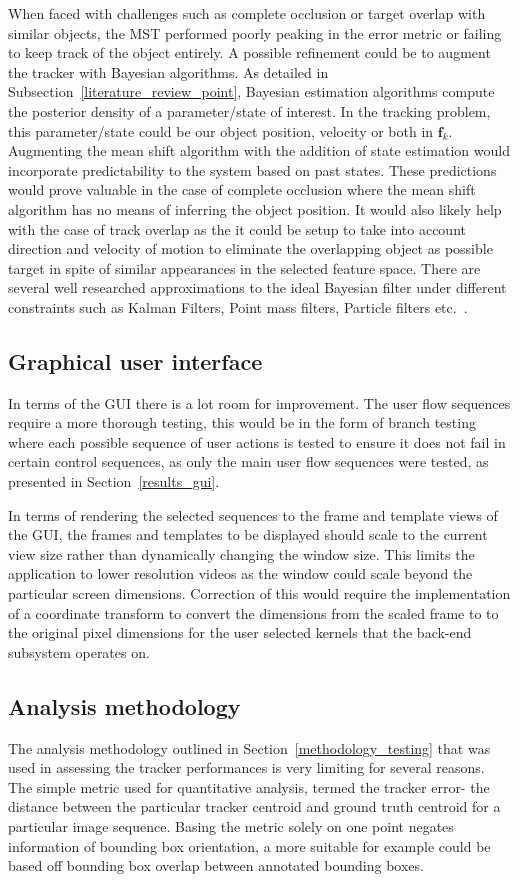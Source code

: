When faced with challenges such as complete occlusion or target overlap with
similar objects, the MST performed poorly peaking in the error metric or failing
to keep track of the object entirely. A possible refinement could be to augment
the tracker with Bayesian algorithms. As detailed in
Subsection~\ref{literature_review_point}, Bayesian estimation algorithms compute
the posterior density of a parameter/state of interest. In the tracking
problem, this parameter/state could be our object position, velocity or both in
$\mathbf{f}_k$. 
Augmenting the mean shift algorithm with the addition of state estimation  would
incorporate predictability to the system based on past states. These predictions
would prove valuable in the case of complete occlusion where the mean shift
algorithm has no means of inferring the object position. It would also likely
help with the case of track overlap as the it could be setup to take into
account direction and velocity of motion to eliminate the overlapping object as
possible target in spite of similar appearances in the selected
feature space.
There are several well researched approximations to the ideal Bayesian filter
under different constraints such as Kalman Filters, Point mass filters, Particle
filters etc.~\cite{Challa2011}.  

\subsection{Graphical user interface}\label{future_analysis}
In terms of the GUI there is a lot room for improvement. The user flow sequences
require a more thorough testing, this would be in the form of branch testing where
each possible sequence of user actions is tested to ensure it does not fail in
certain control sequences, as only the main user flow sequences were tested, as
presented in Section~\ref{results_gui}.

In terms of rendering the selected sequences to the frame and template views
of the GUI, the frames and templates to be displayed should scale to the current
view size rather than dynamically changing the window size. This limits the
application to lower resolution videos as the window could scale beyond the
particular screen dimensions.
Correction of this would require the implementation of a coordinate transform
to convert the dimensions from the scaled frame to to the original pixel
dimensions for the user selected kernels that the back-end subsystem operates on.

\subsection{Analysis methodology}\label{future_analysis}
The analysis methodology outlined in Section~\ref{methodology_testing} that was
used in assessing the tracker performances is very limiting for several reasons.
The simple metric used for quantitative analysis, termed the tracker error- the
distance between the particular tracker centroid and ground truth centroid for a
particular image sequence. Basing the metric solely on one point negates
information of bounding box orientation, a more suitable for example could be
based off bounding box overlap between annotated bounding boxes. 

